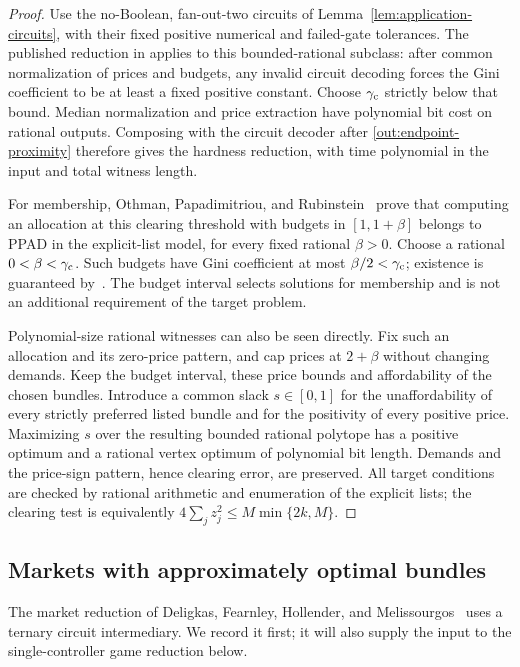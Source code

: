 \begin{proof}
Use the no-Boolean, fan-out-two circuits of
Lemma~\ref{lem:application-circuits}, with their fixed positive numerical
and failed-gate tolerances. The published reduction in
\cite[Appendix~B.2--B.3]{BPR2016} applies to this bounded-rational
subclass: after common normalization of prices and budgets, any
invalid circuit decoding forces the Gini coefficient to be at least a fixed
positive constant. Choose $\gamma_{\rm c}$ strictly below that
bound. Median normalization and price extraction have polynomial bit
cost on rational outputs. Composing with the circuit decoder after
\eqref{out:endpoint-proximity} therefore gives the hardness reduction,
with time polynomial in the input and total witness length.

For membership, Othman, Papadimitriou, and
Rubinstein~\cite[Appendix~A, Remarks~1--2]{OPR2014} prove that computing
an allocation at this clearing threshold with budgets in
$[1,1+\beta]$ belongs to PPAD in the explicit-list model, for every
fixed rational $\beta>0$. Choose a rational $0<\beta<\gamma_{\rm c}$.
Such budgets have Gini coefficient at most $\beta/2<\gamma_{\rm c}$;
existence is guaranteed by~\cite[Theorem~1]{Budish2011}.
The budget interval selects solutions for membership and is not an
additional requirement of the target problem.

Polynomial-size rational witnesses can also be seen directly.
Fix such an allocation and its zero-price pattern, and cap prices at
$2+\beta$ without changing demands. Keep the budget interval, these
price bounds and affordability of the chosen bundles. Introduce a
common slack $s\in[0,1]$ for the unaffordability of every strictly
preferred listed bundle and for the positivity of every positive
price. Maximizing $s$ over the resulting bounded rational polytope
has a positive optimum and a rational vertex optimum of polynomial
bit length. Demands and the price-sign pattern, hence clearing error,
are preserved. All target conditions are checked by rational
arithmetic and enumeration of the explicit lists; the clearing test
is equivalently $4\sum_jz_j^2\leq M\min\{2k,M\}$.
\end{proof}


\subsection{Markets with approximately optimal bundles}

The market reduction of Deligkas, Fearnley, Hollender, and
Melissourgos~\cite{Fisher2026} uses a ternary circuit intermediary.
We record it first; it will also supply the input to the single-controller
game reduction below.

